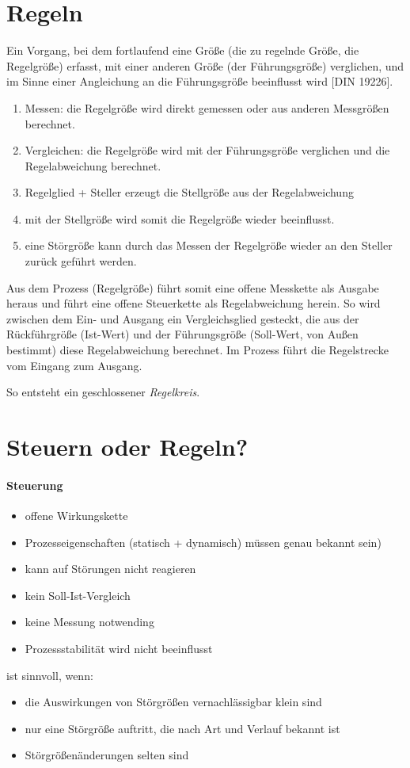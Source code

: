 \documentclass{scrreprt}
\begin{document}
\section{Regeln}
Ein Vorgang, bei dem fortlaufend eine Größe (die zu regelnde Größe, die Regelgröße) erfasst, mit einer anderen Größe (der Führungsgröße) verglichen, und im Sinne einer Angleichung an die Führungsgröße beeinflusst wird [DIN 19226].
\begin{enumerate}
\item Messen: die Regelgröße wird direkt gemessen oder aus anderen Messgrößen berechnet.
\item Vergleichen: die Regelgröße wird mit der Führungsgröße verglichen und die Regelabweichung berechnet.
\item Regelglied + Steller erzeugt die Stellgröße aus der Regelabweichung
\item[\textbullet] mit der Stellgröße wird somit die Regelgröße wieder beeinflusst.
\item[\textbullet] eine Störgröße kann durch das Messen der Regelgröße wieder an den Steller zurück geführt werden.
\end{enumerate}
Aus dem Prozess (Regelgröße) führt somit eine offene Messkette als Ausgabe heraus und führt eine offene Steuerkette als Regelabweichung herein. So wird zwischen dem Ein- und Ausgang ein Vergleichsglied gesteckt, die aus der Rückführgröße (Ist-Wert) und der Führungsgröße (Soll-Wert, von Außen bestimmt) diese Regelabweichung berechnet. Im Prozess führt die Regelstrecke vom Eingang zum Ausgang.

So entsteht ein geschlossener \emph{Regelkreis}.

\section{Steuern oder Regeln?}
\paragraph{Steuerung}
\begin{itemize}
\item offene Wirkungskette
\item Prozesseigenschaften (statisch + dynamisch) müssen genau bekannt sein)
\item kann auf Störungen nicht reagieren
\item kein Soll-Ist-Vergleich
\item keine Messung notwending
\item Prozessstabilität wird nicht beeinflusst
\end{itemize}
ist sinnvoll, wenn:
\begin{itemize}
\item die Auswirkungen von Störgrößen vernachlässigbar klein sind
\item nur eine Störgröße auftritt, die nach Art und Verlauf bekannt ist
\item Störgrößenänderungen selten sind
\end{itemize}
\end{document}
